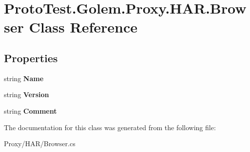 \hypertarget{class_proto_test_1_1_golem_1_1_proxy_1_1_h_a_r_1_1_browser}{\section{Proto\-Test.\-Golem.\-Proxy.\-H\-A\-R.\-Browser Class Reference}
\label{class_proto_test_1_1_golem_1_1_proxy_1_1_h_a_r_1_1_browser}
}
\subsection*{Properties}
\begin{DoxyCompactItemize}
\item 
\hypertarget{class_proto_test_1_1_golem_1_1_proxy_1_1_h_a_r_1_1_browser_a68e480240f6fcedf02b16b58a5171e61}{string {\bfseries Name}}\label{class_proto_test_1_1_golem_1_1_proxy_1_1_h_a_r_1_1_browser_a68e480240f6fcedf02b16b58a5171e61}

\item 
\hypertarget{class_proto_test_1_1_golem_1_1_proxy_1_1_h_a_r_1_1_browser_aa65d9d6c2833d63b4dcb65bfe09831f0}{string {\bfseries Version}}\label{class_proto_test_1_1_golem_1_1_proxy_1_1_h_a_r_1_1_browser_aa65d9d6c2833d63b4dcb65bfe09831f0}

\item 
\hypertarget{class_proto_test_1_1_golem_1_1_proxy_1_1_h_a_r_1_1_browser_ad22565d80fcf575f3c89e729943f94a9}{string {\bfseries Comment}}\label{class_proto_test_1_1_golem_1_1_proxy_1_1_h_a_r_1_1_browser_ad22565d80fcf575f3c89e729943f94a9}

\end{DoxyCompactItemize}


The documentation for this class was generated from the following file\-:\begin{DoxyCompactItemize}
\item 
Proxy/\-H\-A\-R/Browser.\-cs\end{DoxyCompactItemize}
